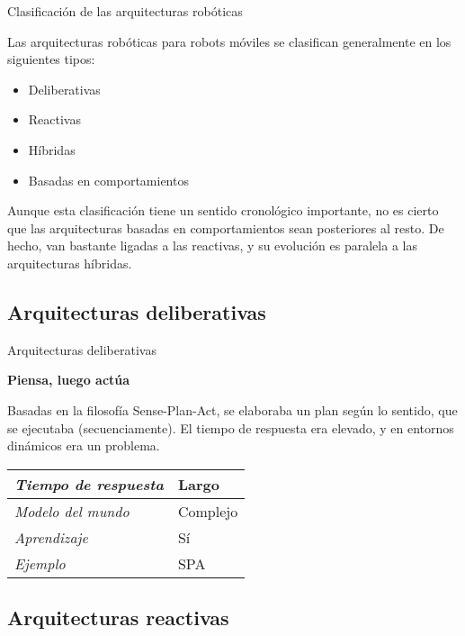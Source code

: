 \documentclass{beamer}
\begin{document}
\begin{frame}{Clasificación de las arquitecturas robóticas}

Las arquitecturas robóticas para robots móviles se clasifican generalmente en los siguientes tipos:

\begin{itemize}
	\item Deliberativas
	\item Reactivas
	\item Híbridas
	\item Basadas en comportamientos
\end{itemize}

Aunque esta clasificación tiene un sentido cronológico importante, no es cierto que las arquitecturas basadas en comportamientos sean posteriores al resto. De hecho, van bastante ligadas a las reactivas, y su evolución es paralela a las arquitecturas híbridas.

\end{frame}

\subsection{Arquitecturas deliberativas}

\begin{frame}{Arquitecturas deliberativas}

\textbf{Piensa, luego actúa}

Basadas en la filosofía Sense-Plan-Act, se elaboraba un plan según lo sentido, que se ejecutaba (secuenciamente). El tiempo de respuesta era elevado, y en entornos dinámicos era un problema.

\begin{tabular}{ l | l }

\emph{Tiempo de respuesta} & Largo \\ \hline
\emph{Modelo del mundo} & Complejo \\ \hline
\emph{Aprendizaje} & Sí \\ \hline
\emph{Ejemplo} & SPA
\end{tabular}

\end{frame}

\subsection{Arquitecturas reactivas}
\end{document}
